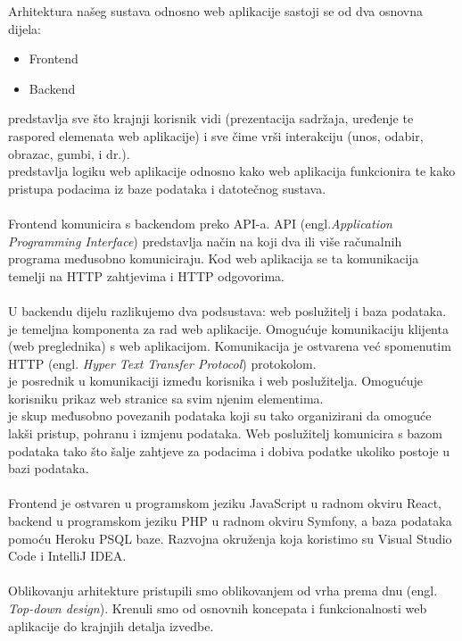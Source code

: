 	
	Arhitektura našeg sustava odnosno web aplikacije sastoji se od dva osnovna dijela:
	\begin{itemize}
		\item Frontend
		\item Backend
	\end{itemize}
	 predstavlja sve što krajnji korisnik vidi (prezentacija sadržaja, uređenje te raspored elemenata web aplikacije) i sve čime vrši interakciju (unos, odabir, obrazac, gumbi, i dr.). \\
	 predstavlja logiku web aplikacije odnosno kako web  aplikacija funkcionira te kako pristupa podacima iz baze podataka i datotečnog sustava.\\\\
	Frontend komunicira s backendom preko API-a. API (engl.\textit{Application Programming Interface}) predstavlja način na koji dva ili više računalnih programa međusobno komuniciraju. Kod web aplikacija se ta komunikacija temelji na HTTP zahtjevima i HTTP odgovorima.\\\\
	U backendu dijelu razlikujemo dva podsustava: web poslužitelj i baza podataka.\\
	 je temeljna komponenta za rad web aplikacije. Omogućuje komunikaciju klijenta (web preglednika) s web aplikacijom. Komunikacija je ostvarena već spomenutim HTTP (engl. \textit{Hyper Text Transfer Protocol}) protokolom. \\
	 je posrednik u komunikaciji između korisnika i web poslužitelja. Omogućuje korisniku prikaz web stranice sa svim njenim elementima.\\
	 je skup međusobno povezanih podataka koji su tako organizirani da omoguće lakši pristup, pohranu i izmjenu podataka. Web poslužitelj komunicira s bazom podataka tako što šalje zahtjeve za podacima i dobiva podatke ukoliko postoje u bazi podataka.\\\\
	Frontend je ostvaren u programskom jeziku JavaScript u radnom okviru React, backend u programskom jeziku PHP u radnom okviru Symfony, a baza podataka pomoću Heroku PSQL baze. Razvojna okruženja koja koristimo su Visual Studio Code i IntelliJ IDEA.
	\\\\
	Oblikovanju arhitekture pristupili smo oblikovanjem od vrha prema dnu (engl. \textit{Top-down design}). Krenuli smo od osnovnih koncepata i funkcionalnosti web aplikacije do krajnjih detalja izvedbe. 
		
